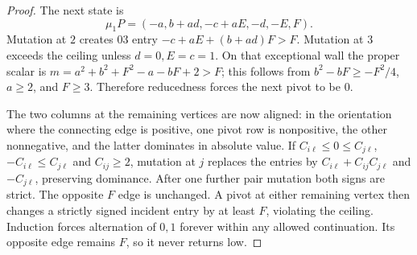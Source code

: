 \begin{proof}
The next state is
\begin{equation}\label{eq:strongnext}
 \mu_1P=(-a,b+ad,-c+aE,-d,-E,F).
\end{equation}
Mutation at $2$ creates $03$ entry $-c+aE+(b+ad)F>F$. Mutation at $3$ exceeds the ceiling unless $d=0,E=c=1$. On that exceptional wall the proper scalar is
$m=a^2+b^2+F^2-a-bF+2>F$; this follows from
$b^2-bF\ge-F^2/4$, $a\ge2$, and $F\ge3$. Therefore reducedness forces the next pivot to be $0$.

The two columns at the remaining vertices are now aligned: in the orientation where the connecting edge is positive, one pivot row is nonpositive, the other nonnegative, and the latter dominates in absolute value. If $C_{i\ell}\le0\le C_{j\ell}$, $-C_{i\ell}\le C_{j\ell}$ and $C_{ij}\ge2$, mutation at $j$ replaces the entries by $C_{i\ell}+C_{ij}C_{j\ell}$ and $-C_{j\ell}$, preserving dominance. After one further pair mutation both signs are strict. The opposite $F$ edge is unchanged. A pivot at either remaining vertex then changes a strictly signed incident entry by at least $F$, violating the ceiling. Induction forces alternation of $0,1$ forever within any allowed continuation. Its opposite edge remains $F$, so it never returns low.
\end{proof}

